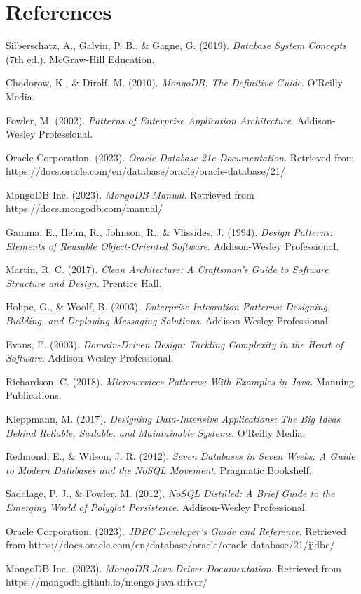 \documentclass[12pt,a4paper]{article}
\begin{document}
\section{References}

\begin{thebibliography}{15}

Silberschatz, A., Galvin, P. B., \& Gagne, G. (2019). \textit{Database System Concepts} (7th ed.). McGraw-Hill Education.

Chodorow, K., \& Dirolf, M. (2010). \textit{MongoDB: The Definitive Guide}. O'Reilly Media.

Fowler, M. (2002). \textit{Patterns of Enterprise Application Architecture}. Addison-Wesley Professional.

Oracle Corporation. (2023). \textit{Oracle Database 21c Documentation}. Retrieved from https://docs.oracle.com/en/database/oracle/oracle-database/21/

MongoDB Inc. (2023). \textit{MongoDB Manual}. Retrieved from https://docs.mongodb.com/manual/

Gamma, E., Helm, R., Johnson, R., \& Vlissides, J. (1994). \textit{Design Patterns: Elements of Reusable Object-Oriented Software}. Addison-Wesley Professional.

Martin, R. C. (2017). \textit{Clean Architecture: A Craftsman's Guide to Software Structure and Design}. Prentice Hall.

Hohpe, G., \& Woolf, B. (2003). \textit{Enterprise Integration Patterns: Designing, Building, and Deploying Messaging Solutions}. Addison-Wesley Professional.

Evans, E. (2003). \textit{Domain-Driven Design: Tackling Complexity in the Heart of Software}. Addison-Wesley Professional.

Richardson, C. (2018). \textit{Microservices Patterns: With Examples in Java}. Manning Publications.

Kleppmann, M. (2017). \textit{Designing Data-Intensive Applications: The Big Ideas Behind Reliable, Scalable, and Maintainable Systems}. O'Reilly Media.

Redmond, E., \& Wilson, J. R. (2012). \textit{Seven Databases in Seven Weeks: A Guide to Modern Databases and the NoSQL Movement}. Pragmatic Bookshelf.

Sadalage, P. J., \& Fowler, M. (2012). \textit{NoSQL Distilled: A Brief Guide to the Emerging World of Polyglot Persistence}. Addison-Wesley Professional.

Oracle Corporation. (2023). \textit{JDBC Developer's Guide and Reference}. Retrieved from https://docs.oracle.com/en/database/oracle/oracle-database/21/jjdbc/

MongoDB Inc. (2023). \textit{MongoDB Java Driver Documentation}. Retrieved from https://mongodb.github.io/mongo-java-driver/

\end{thebibliography}
\end{document}
